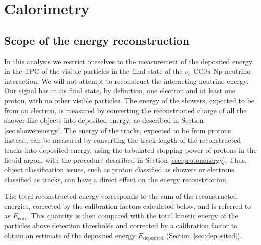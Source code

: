 
\section{Calorimetry}\label{sec:energyreco}
\subsection{Scope of the energy reconstruction}
In this analysis we restrict ourselves to the measurement of the deposited energy in the TPC of the visible particles in the final state of the $\nu_e$ CC0$\pi$-Np neutrino interaction. We will not attempt to reconstruct the interacting neutrino energy. Our signal has in its final state, by definition, one electron and at least one proton, with no other visible particles. The energy of the showers, expected to be from an electron, is measured by converting the reconstructed charge of all the shower-like objects into deposited energy, as described in Section \ref{sec:showerenergy}. The energy of the tracks, expected to be from protons instead, can be measured by converting the track length of the reconstructed tracks into deposited energy, using the tabulated stopping power of protons in the liquid argon, with the procedure described in Section \ref{sec:protonenergy}. Thus, object classification issues, such as proton classified as showers or electrons classified as tracks, can have a direct effect on the energy reconstruction.

The total reconstructed energy corresponds to the sum of the reconstructed energies, corrected by the calibration factors calculated below, and is referred to as $E_{\mathrm{corr}}$. This quantity is then compared with the total kinetic energy of the particles above detection thresholds and corrected by a calibration factor to obtain an estimate of the deposited energy $E_{\mathrm{deposited}}$ (Section \ref{sec:deposited}).


